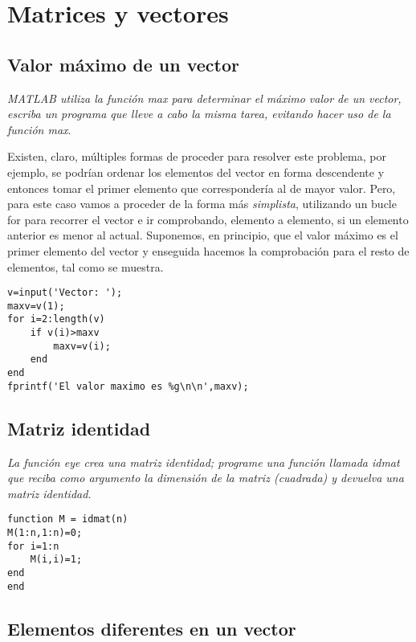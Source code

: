 \chapter{Matrices y vectores}

\section{Valor máximo de un vector}

\textit{MATLAB utiliza la función max para determinar el máximo valor de un vector, escriba un programa 
que lleve a cabo la misma tarea, evitando hacer uso de la función max}.



Existen, claro, múltiples formas de proceder para resolver este problema, por ejemplo, se podrían 
ordenar los elementos del vector en forma descendente y entonces tomar el primer elemento que 
correspondería al de mayor valor. Pero, para este caso vamos a proceder de la forma más \textit{simplista}, 
utilizando un bucle for para recorrer el vector e ir comprobando, elemento a elemento, si un elemento 
anterior es menor al actual. Suponemos, en principio, que el valor máximo es el primer elemento del vector 
y enseguida hacemos la comprobación para el resto de elementos, tal como se muestra.

\begin{verbatim}
v=input('Vector: ');
maxv=v(1);
for i=2:length(v)
    if v(i)>maxv
        maxv=v(i);
    end
end
fprintf('El valor maximo es %g\n\n',maxv);
\end{verbatim}

\section{Matriz identidad}

\textit{La función eye crea una matriz identidad; programe una función llamada idmat que reciba 
como argumento la dimensión de la matriz (cuadrada) y devuelva una matriz identidad.}



\begin{verbatim}
function M = idmat(n)
M(1:n,1:n)=0;
for i=1:n
    M(i,i)=1;
end
end
\end{verbatim}


\section{Elementos diferentes en un vector}

